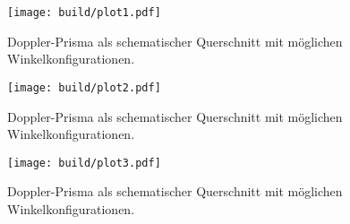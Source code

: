                         


\begin{figure}
    \centering
    \texttt{[image: build/plot1.pdf]}
    \caption{Doppler-Prisma als schematischer Querschnitt mit möglichen Winkelkonfigurationen. \cite{skript}} 
    \label{fig:figskizze1}
\end{figure}
\begin{figure}
    \centering
    \texttt{[image: build/plot2.pdf]}
    \caption{Doppler-Prisma als schematischer Querschnitt mit möglichen Winkelkonfigurationen. \cite{skript}} 
    \label{fig:figskizze1}
\end{figure}
\begin{figure}
    \centering
    \texttt{[image: build/plot3.pdf]}
    \caption{Doppler-Prisma als schematischer Querschnitt mit möglichen Winkelkonfigurationen. \cite{skript}} 
    \label{fig:figskizze1}
\end{figure}